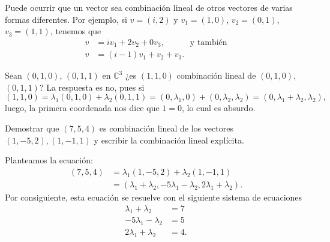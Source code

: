 \documentclass[handout]{beamer} %
\newcommand{\C}{\mathbb C}
\begin{document}
\begin{frame}

\begin{ejemplo}
    Puede ocurrir que un vector sea combinación lineal de otros vectores de varias formas diferentes. Por ejemplo,   si   $v = (i,2)$ y $v_1 = (1,0)$, $v_2 = (0,1)$, $v_3 = (1,1)$,  tenemos que
        \begin{align*}
            v &= iv_1+2v_2+0v_3,\quad\quad\quad\text{y también}\\
            v &= (i-1)v_1 + v_2 + v_3.  
        \end{align*}
\end{ejemplo}
\pause
\begin{ejemplo}
        Sean $(0,1,0)$, $(0,1,1)$ en $\C^3$ ¿es $(1,1,0)$ combinación lineal de $(0,1,0)$, $(0,1,1)$? La respuesta es no, pues si 
        $$
        (1,1,0) = \lambda_1(0,1,0)+ \lambda_2(0,1,1) = (0,\lambda_1,0)+ (0,\lambda_2,\lambda_2) = (0,\lambda_1+\lambda_2,\lambda_2),
        $$ 
        luego, la primera coordenada nos dice que $1=0$, lo cual es absurdo. 
        
\end{ejemplo}
    
    
\end{frame}


\begin{frame}
    \begin{ejemplo}\label{vector-en-subespacio}
        Demostrar que $(7, 5, 4)$  es combinación lineal de los vectores $(1,-5,2), (1,-1,1)$ y escribir la combinación lineal explícita.
    \end{ejemplo} 
    
    \begin{solucion}
        
    
    Planteamos la ecuación:
    \begin{align*}
        (7, 5, 4) &= \lambda_1(1,-5,2)+\lambda_2 (1,-1,1)
        \\
        &= (\lambda_1+\lambda_2,-5\lambda_1-\lambda_2,2\lambda_1+\lambda_2).
    \end{align*}
    Por consiguiente,  esta ecuación se resuelve con el siguiente sistema de ecuaciones
    \begin{align*}
        \lambda_1+\lambda_2 &= 7 \\
        -5\lambda_1-\lambda_2&= 5 \\
        2\lambda_1+\lambda_2 &= 4.
    \end{align*}

    \end{solucion}
    \end{frame}
\end{document}
